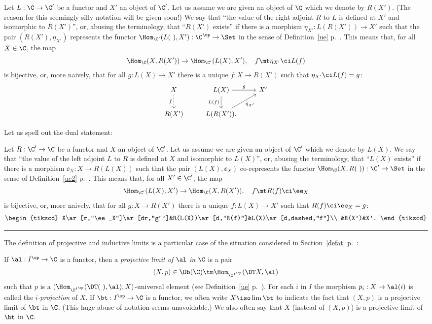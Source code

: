 \documentclass[12pt]{article}
\theoremstyle{remark}
\theoremstyle{definition}
\begin{document}
Let $L:\C\to\C'$ be a functor and $X'$ an object of $\C'$. Let us assume we are given an object of $\C$ which we denote by $R(X')$. (The reason for this seemingly silly notation will be given soon!) We say that ``the value of the right adjoint $R$ to $L$ is defined at $X'$ and isomorphic to $R(X')$'', or, abusing the terminology, that ``$R(X')$ exists'' if there is a morphism $\eta_{X'}:L(R(X'))\to X'$ such that the pair $(R(X'),\eta_{X'})$ represents the functor $\Hom_{\C'}(L(\ ),X'):\C^{\op}\to\Set$ in the sense of Definition~\ref{ue} p.~. This means that, for all $X\in\C$, the map 
$$
\Hom_\C(X,R(X'))\to\Hom_{\C'}(L(X),X'),\quad f\mt\eta_{X'}\ci L(f)
$$ 
is bijective, or, more naively, that for all $g:L(X)\to X'$ there is a unique $f:X\to R(X')$ such that $\eta_{X'}\ci L(f)=g$: 
$$
\begin{tikzcd}
X\ar[d,dashed,"f"']&L(X)\ar[d,"L(f)"']\ar[r,"g"]&X'\\ 
R(X')&L(R(X')).\ar[ru,"\eta_{X'}"']
\end{tikzcd}
$$ 

Let us spell out the dual statement:

Let $R:\C'\to\C$ be a functor and $X$ an object of $\C'$. Let us assume we are given an object of $\C'$ which we denote by $L(X)$. We say that ``the value of the left adjoint $L$ to $R$ is defined at $X$ and isomorphic to $L(X)$'', or, abusing the terminology, that ``$L(X)$ exists'' if there is a morphism $\ee_X:X\to R(L(X))$ such that the pair $(L(X),\ee_X)$ co-represents the functor $\Hom_\C(X,R(\ )):\C'\to\Set$ in the sense of Definition~\ref{ue2} p.~. This means that, for all $X'\in\C'$, the map 
$$
\Hom_{\C'}(L(X),X')\to\Hom_\C(X,R(X')),\quad f\mt R(f)\ci\ee_X
$$ 
is bijective, or, more naively, that for all $g:X\to R(X')$ there is a unique $f:L(X)\to X'$ such that $R(f)\ci\ee_X=g$: 
$$
\begin{tikzcd}
X\ar[r,"\ee_X"]\ar[dr,"g"']&R(L(X))\ar[d,"R(f)"]&L(X)\ar[d,dashed,"f"]\\ 
&R(X')&X'.
\end{tikzcd}
$$ 

\hrule

The definition of projective and inductive limits is a particular case of the situation considered in Section~\ref{defat} p.~:%

\begin{df}
If $\al:I^{\op}\to\C$ is a functor, then a {\em projective limit of} $\al$ {\em in} $\C$ is a pair 
$$
(X,p)\in\Ob(\C)\tm\Hom_{\C^{I^{\op}}}(\DT X,\al)
$$
such that $p$ is a $(\Hom_{\C^{I^{\op}}}(\DT(\ ),\al),X)$\--universal element (see Definition~\ref{ue} p.~). For each $i$ in $I$ the morphism $p_i:X\to\al(i)$ is called the $i$-{\em projection} of $X$. If $\bt:I^{\op}\to\C$ is a functor, we often write $X\iso\lim\bt$ to indicate the fact that $(X,p)$ is a projective limit of $\bt$ in $\C$. (This huge abuse of notation seems unavoidable.) We also often say that $X$ (instead of $(X,p)$) is a projective limit of $\bt$ in $\C$. %
\end{df}
\end{document}
